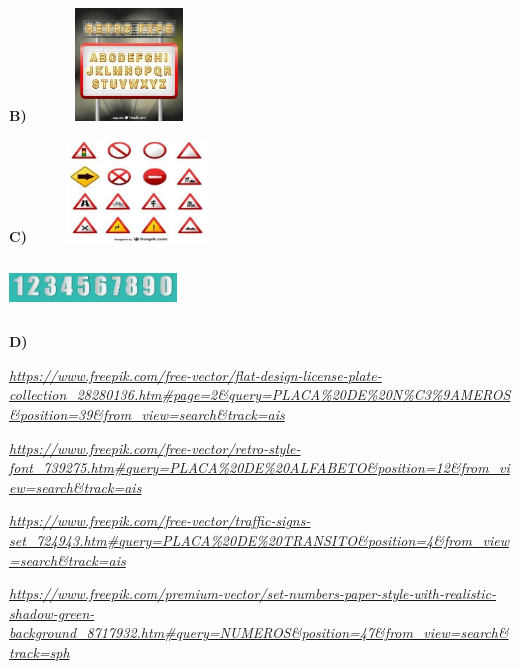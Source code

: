 \textbf{B)}
\includegraphics[width=2.03125in,height=1.17361in]{media/image223.jpg}

\textbf{C)}
\includegraphics[width=2.20764in,height=1.07569in]{media/image224.jpg}

\includegraphics[width=1.75000in,height=0.54792in]{media/image225.jpg}

\textbf{D)}

\href{https://www.freepik.com/free-vector/flat-design-license-plate-collection_28280136.htm\#page=2\&query=PLACA\%20DE\%20N\%C3\%9AMEROS\&position=39\&from_view=search\&track=ais}{\emph{https://www.freepik.com/free-vector/flat-design-license-plate-collection\_28280136.htm\#page=2\&query=PLACA\%20DE\%20N\%C3\%9AMEROS\&position=39\&from\_view=search\&track=ais}}

\href{https://www.freepik.com/free-vector/retro-style-font_739275.htm\#query=PLACA\%20DE\%20ALFABETO\&position=12\&from_view=search\&track=ais}{\emph{https://www.freepik.com/free-vector/retro-style-font\_739275.htm\#query=PLACA\%20DE\%20ALFABETO\&position=12\&from\_view=search\&track=ais}}

\href{https://www.freepik.com/free-vector/traffic-signs-set_724943.htm\#query=PLACA\%20DE\%20TRANSITO\&position=4\&from_view=search\&track=ais}{\emph{https://www.freepik.com/free-vector/traffic-signs-set\_724943.htm\#query=PLACA\%20DE\%20TRANSITO\&position=4\&from\_view=search\&track=ais}}

\href{https://www.freepik.com/premium-vector/set-numbers-paper-style-with-realistic-shadow-green-background_8717932.htm\#query=NUMEROS\&position=47\&from_view=search\&track=sph}{\emph{https://www.freepik.com/premium-vector/set-numbers-paper-style-with-realistic-shadow-green-background\_8717932.htm\#query=NUMEROS\&position=47\&from\_view=search\&track=sph}}

